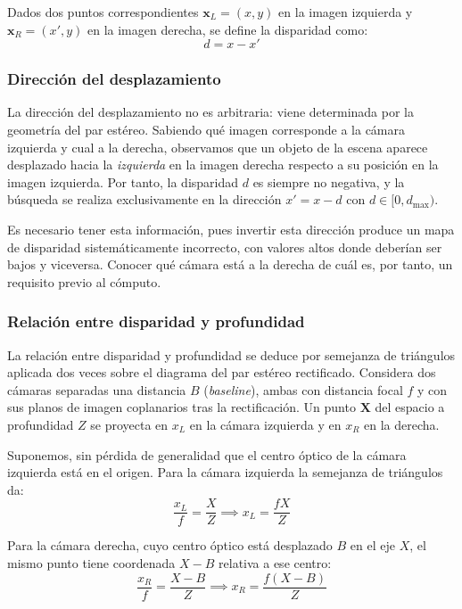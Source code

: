 \documentclass[
10pt, %
a4paper, %
oneside, %
headinclude,footinclude, %
BCOR=5mm, %
]{scrartcl}
\begin{document}
\begin{definition}[Disparidad]
    Dados dos puntos correspondientes $\mathbf{x}_L = (x, y)$ en la imagen izquierda y $\mathbf{x}_R = (x', y)$ en la imagen derecha, se define la disparidad como:
    $$d = x - x'$$
\end{definition}

\subsubsection{Dirección del desplazamiento}

La dirección del desplazamiento no es arbitraria: viene determinada
por la geometría del par estéreo. Sabiendo qué imagen corresponde
a la cámara izquierda y cual a la derecha, observamos que un objeto 
de la escena aparece desplazado hacia la \textit{izquierda} en la 
imagen derecha respecto a su posición en la imagen izquierda. Por tanto, 
la disparidad $d$ es siempre no negativa, y la búsqueda se realiza exclusivamente 
en la dirección $x' = x - d$ con $d \in [0, d_{\max})$.

Es necesario tener esta información, pues invertir esta dirección produce 
un mapa de disparidad sistemáticamente incorrecto, con valores altos donde 
deberían ser bajos y viceversa. Conocer qué cámara está a la derecha de cuál 
es, por tanto, un requisito previo al cómputo.

\subsubsection{Relación entre disparidad y profundidad}

La relación entre disparidad y profundidad se deduce por semejanza de triángulos
aplicada dos veces sobre el diagrama del par estéreo rectificado. Considera dos
cámaras separadas una distancia $B$ (\textit{baseline}), ambas con distancia focal
$f$ y con sus planos de imagen coplanarios tras la rectificación. Un punto
$\mathbf{X}$ del espacio a profundidad $Z$ se proyecta en $x_L$ en la cámara
izquierda y en $x_R$ en la derecha.

Suponemos, sin pérdida de generalidad que el centro óptico de la cámara izquierda
está en el origen. Para la cámara izquierda la semejanza de triángulos da:
$$\frac{x_L}{f} = \frac{X}{Z} \implies x_L = \frac{fX}{Z}$$

Para la cámara derecha, cuyo centro óptico está desplazado $B$ en el eje $X$,
el mismo punto tiene coordenada $X - B$ relativa a ese centro:
$$\frac{x_R}{f} = \frac{X - B}{Z} \implies x_R = \frac{f(X-B)}{Z}$$
\end{document}
